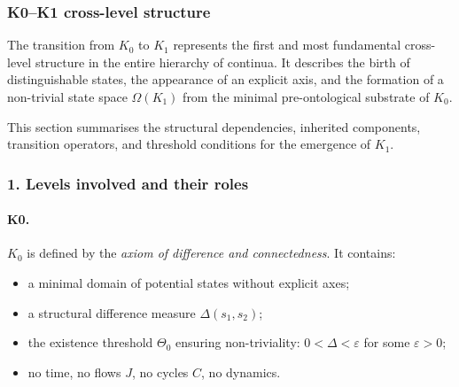
\subsubsection{K0–K1 cross-level structure}
\label{sec:crossk-k0-k1}

The transition from $K_0$ to $K_1$ represents the first and most fundamental
cross-level structure in the entire hierarchy of continua. It describes the
birth of distinguishable states, the appearance of an explicit axis, and the
formation of a non-trivial state space $\Omega(K_1)$ from the minimal
pre-ontological substrate of $K_0$.

This section summarises the structural dependencies, inherited components,
transition operators, and threshold conditions for the emergence of $K_1$.

\subsubsection{1. Levels involved and their roles}

\paragraph{K0.}
$K_0$ is defined by the \emph{axiom of difference and connectedness}.
It contains:
\begin{itemize}
  \item a minimal domain of potential states without explicit axes;
  \item a structural difference measure $\Delta(s_1,s_2)$;
  \item the existence threshold $\Theta_0$ ensuring non-triviality:
        $0 < \Delta < \varepsilon$ for some $\varepsilon>0$;
  \item no time, no flows $J$, no cycles $C$, no dynamics.
\end{itemize}

